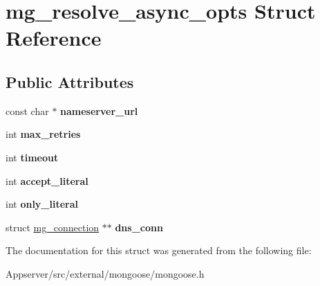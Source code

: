 \hypertarget{structmg__resolve__async__opts}{}\section{mg\+\_\+resolve\+\_\+async\+\_\+opts Struct Reference}
\label{structmg__resolve__async__opts}
\subsection*{Public Attributes}
\begin{DoxyCompactItemize}
\item 
const char $\ast$ {\bfseries nameserver\+\_\+url}\hypertarget{structmg__resolve__async__opts_adb3ba3be7ca7837367e6b77575d9ba4e}{}\label{structmg__resolve__async__opts_adb3ba3be7ca7837367e6b77575d9ba4e}

\item 
int {\bfseries max\+\_\+retries}\hypertarget{structmg__resolve__async__opts_a6db0305ac9736d2f98507ce07bebcd59}{}\label{structmg__resolve__async__opts_a6db0305ac9736d2f98507ce07bebcd59}

\item 
int {\bfseries timeout}\hypertarget{structmg__resolve__async__opts_adeb3e0102e6e1eb86340e86fcc2b3560}{}\label{structmg__resolve__async__opts_adeb3e0102e6e1eb86340e86fcc2b3560}

\item 
int {\bfseries accept\+\_\+literal}\hypertarget{structmg__resolve__async__opts_a9e7955b13fd4cac697a92ca28dff30ae}{}\label{structmg__resolve__async__opts_a9e7955b13fd4cac697a92ca28dff30ae}

\item 
int {\bfseries only\+\_\+literal}\hypertarget{structmg__resolve__async__opts_ae7bb70da865548e33663e1292e334293}{}\label{structmg__resolve__async__opts_ae7bb70da865548e33663e1292e334293}

\item 
struct \hyperlink{structmg__connection}{mg\+\_\+connection} $\ast$$\ast$ {\bfseries dns\+\_\+conn}\hypertarget{structmg__resolve__async__opts_ac82e8d612fe2f822fc99ca3bd2d9921c}{}\label{structmg__resolve__async__opts_ac82e8d612fe2f822fc99ca3bd2d9921c}

\end{DoxyCompactItemize}


The documentation for this struct was generated from the following file\+:\begin{DoxyCompactItemize}
\item 
Appserver/src/external/mongoose/mongoose.\+h\end{DoxyCompactItemize}
